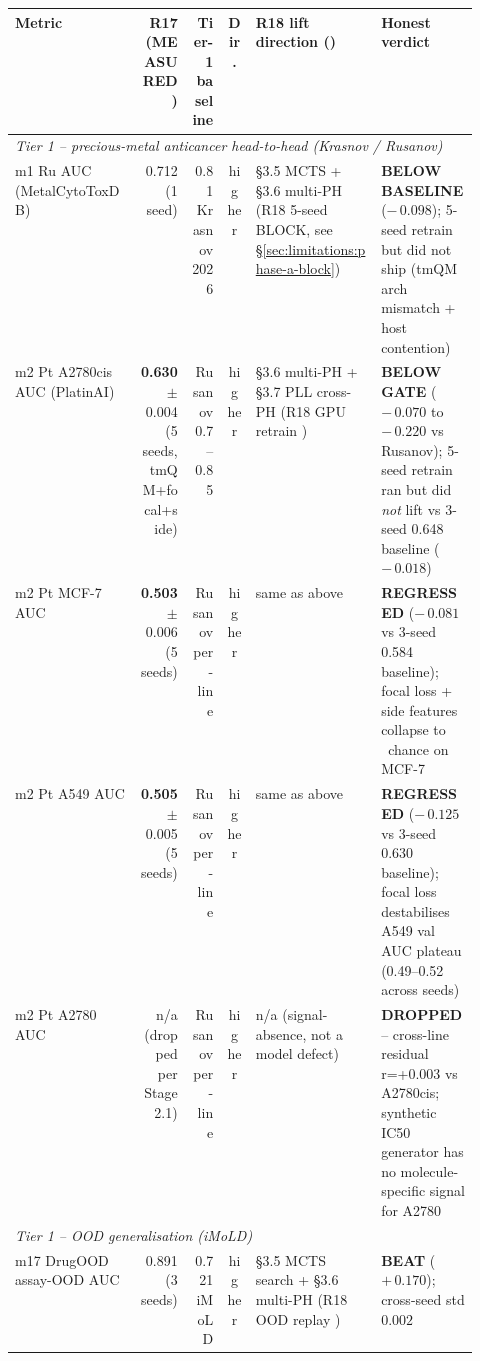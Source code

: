 \begin{table}[ht]
\centering
\small
\setlength{\tabcolsep}{3pt}
\begin{tabular}{p{0.27\linewidth} r r c p{0.27\linewidth} l}
\toprule
\textbf{Metric} & \textbf{R17 (MEASURED)} & \textbf{Tier-1 baseline} & \textbf{Dir.} & \textbf{R18 lift direction (\PROJECTED{})} & \textbf{Honest verdict} \\
\midrule
\multicolumn{6}{l}{\textit{Tier 1 -- precious-metal anticancer head-to-head (Krasnov / Rusanov)}} \\
m1\;\; Ru AUC (MetalCytoToxDB)
  & 0.712 \MEASURED{} (1 seed)
  & 0.81 Krasnov 2026 \CITEDONLY{}
  & higher
  & \S{}3.5 MCTS + \S{}3.6 multi-PH (R18 5-seed BLOCK, see \S{}\ref{sec:limitations:phase-a-block})
  & \textbf{BELOW BASELINE} ($-\,0.098$); 5-seed retrain \PROJECTED{} but did not ship (tmQM arch mismatch + host contention) \\
m2\;\; Pt A2780cis AUC (PlatinAI)
  & \textbf{0.630} $\pm$ 0.004 \MEASURED{} (5 seeds, tmQM+focal+side)
  & Rusanov 0.7--0.85 \CITEDONLY{}
  & higher
  & \S{}3.6 multi-PH + \S{}3.7 PLL cross-PH (R18 GPU retrain \PROJECTED{})
  & \textbf{BELOW GATE} ($-\,0.070$ to $-\,0.220$ vs Rusanov); 5-seed retrain ran but did \emph{not} lift vs 3-seed 0.648 baseline ($-\,0.018$) \\
m2\;\; Pt MCF-7 AUC
  & \textbf{0.503} $\pm$ 0.006 \MEASURED{} (5 seeds)
  & Rusanov per-line \CITEDONLY{}
  & higher
  & same as above
  & \textbf{REGRESSED} ($-\,0.081$ vs 3-seed 0.584 baseline); focal loss + side features collapse to ~chance on MCF-7 \\
m2\;\; Pt A549 AUC
  & \textbf{0.505} $\pm$ 0.005 \MEASURED{} (5 seeds)
  & Rusanov per-line \CITEDONLY{}
  & higher
  & same as above
  & \textbf{REGRESSED} ($-\,0.125$ vs 3-seed 0.630 baseline); focal loss destabilises A549 val AUC plateau (0.49--0.52 across seeds) \\
m2\;\; Pt A2780 AUC
  & n/a \MEASURED{} (dropped per Stage 2.1)
  & Rusanov per-line \CITEDONLY{}
  & higher
  & n/a (signal-absence, not a model defect)
  & \textbf{DROPPED} -- cross-line residual r=+0.003 vs A2780cis; synthetic IC50 generator has no molecule-specific signal for A2780 \\
\midrule
\multicolumn{6}{l}{\textit{Tier 1 -- OOD generalisation (iMoLD)}} \\
m17 DrugOOD assay-OOD AUC
  & 0.891 \MEASURED{} (3 seeds)
  & 0.721 iMoLD \CITEDONLY{}
  & higher
  & \S{}3.5 MCTS search + \S{}3.6 multi-PH (R18 OOD replay \PROJECTED{})
  & \textbf{BEAT} ($+\,0.170$); cross-seed std $0.002$ \\

\end{tabular}
\end{table}

